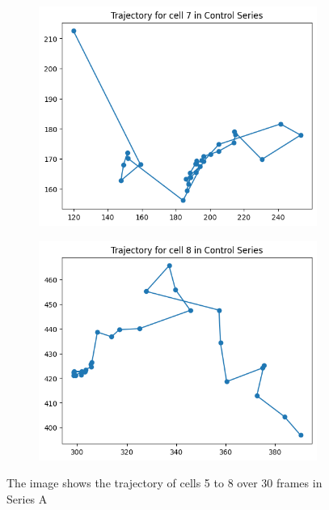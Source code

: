 \documentclass{article}
\begin{document}
\begin{figure}[h!]
\begin{subfigure}[b]{0.5\linewidth}
        \centering
        \includegraphics[width=\linewidth]{Report/Appendix_Images/Trajectory-A-Control/trajectory_7.png}
        \caption{}
    \end{subfigure}%
    \begin{subfigure}[b]{0.5\linewidth}
        \centering
        \includegraphics[width=\linewidth]{Report/Appendix_Images/Trajectory-A-Control/trajectory_8.png}
        \caption{}
    \end{subfigure}
    \caption{The image shows the trajectory of cells 5 to 8 over 30 frames in Series A}
    \label{fig:ChoiceofCells-ControlSeries}
\end{figure}
\end{document}
